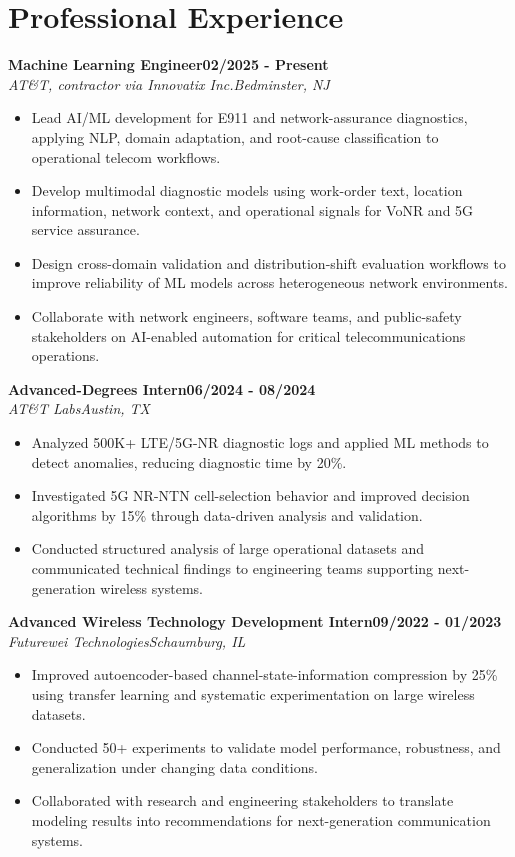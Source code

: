 \documentclass[9pt,letterpaper]{extarticle}
\newcommand{\role}[4]{%
  \Needspace{4\baselineskip}\textbf{#1}\hfill\textbf{#2}\\[-1pt]
  \textit{#3}\hfill\textit{#4}\par}
\begin{document}
\section{Professional Experience}
\role{Machine Learning Engineer}{02/2025 - Present}{AT\&T, contractor via Innovatix Inc.}{Bedminster, NJ}
\begin{itemize}
\item Lead AI/ML development for E911 and network-assurance diagnostics, applying NLP, domain adaptation, and root-cause classification to operational telecom workflows.
\item Develop multimodal diagnostic models using work-order text, location information, network context, and operational signals for VoNR and 5G service assurance.
\item Design cross-domain validation and distribution-shift evaluation workflows to improve reliability of ML models across heterogeneous network environments.
\item Collaborate with network engineers, software teams, and public-safety stakeholders on AI-enabled automation for critical telecommunications operations.
\end{itemize}
\role{Advanced-Degrees Intern}{06/2024 - 08/2024}{AT\&T Labs}{Austin, TX}
\begin{itemize}
\item Analyzed 500K+ LTE/5G-NR diagnostic logs and applied ML methods to detect anomalies, reducing diagnostic time by 20\%.
\item Investigated 5G NR-NTN cell-selection behavior and improved decision algorithms by 15\% through data-driven analysis and validation.
\item Conducted structured analysis of large operational datasets and communicated technical findings to engineering teams supporting next-generation wireless systems.
\end{itemize}
\role{Advanced Wireless Technology Development Intern}{09/2022 - 01/2023}{Futurewei Technologies}{Schaumburg, IL}
\begin{itemize}
\item Improved autoencoder-based channel-state-information compression by 25\% using transfer learning and systematic experimentation on large wireless datasets.
\item Conducted 50+ experiments to validate model performance, robustness, and generalization under changing data conditions.
\item Collaborated with research and engineering stakeholders to translate modeling results into recommendations for next-generation communication systems.
\end{itemize}
\end{document}
